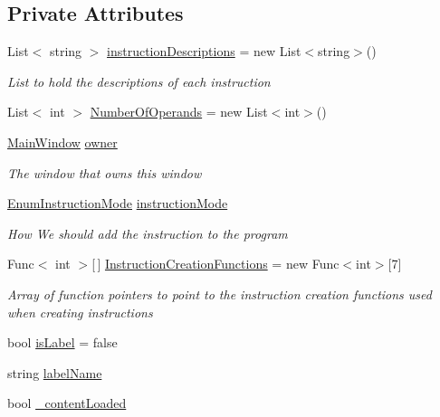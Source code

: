 \subsection*{Private Attributes}
\begin{DoxyCompactItemize}
\item 
List$<$ string $>$ \hyperlink{class_c_p_u___o_s___simulator_1_1_instructions_window_a678ab4df2b78758142472eeed8c5d7ba}{instruction\+Descriptions} = new List$<$string$>$()
\begin{DoxyCompactList}\small\item\em List to hold the descriptions of each instruction \end{DoxyCompactList}\item 
List$<$ int $>$ \hyperlink{class_c_p_u___o_s___simulator_1_1_instructions_window_a6a10065d655000cc37a281b242fb7fb5}{Number\+Of\+Operands} = new List$<$int$>$()
\item 
\hyperlink{class_c_p_u___o_s___simulator_1_1_main_window}{Main\+Window} \hyperlink{class_c_p_u___o_s___simulator_1_1_instructions_window_a954c950c677c61a3b7ed7406b6dc7164}{owner}
\begin{DoxyCompactList}\small\item\em The window that owns this window \end{DoxyCompactList}\item 
\hyperlink{namespace_c_p_u___o_s___simulator_adc17a5a5e004084f05dc8e4d3f70e31f}{Enum\+Instruction\+Mode} \hyperlink{class_c_p_u___o_s___simulator_1_1_instructions_window_aae7addf8e362e26e981b36b9940a53c0}{instruction\+Mode}
\begin{DoxyCompactList}\small\item\em How We should add the instruction to the program \end{DoxyCompactList}\item 
Func$<$ int $>$\mbox{[}$\,$\mbox{]} \hyperlink{class_c_p_u___o_s___simulator_1_1_instructions_window_ae303b32cfc2f5e7cc5ab18df94fd574b}{Instruction\+Creation\+Functions} = new Func$<$int$>$\mbox{[}7\mbox{]}
\begin{DoxyCompactList}\small\item\em Array of function pointers to point to the instruction creation functions used when creating instructions \end{DoxyCompactList}\item 
bool \hyperlink{class_c_p_u___o_s___simulator_1_1_instructions_window_a22f860baf7e7b247c3823e076c4b40fb}{is\+Label} = false
\item 
string \hyperlink{class_c_p_u___o_s___simulator_1_1_instructions_window_a0fd74a9867964da88f17ebb4c0a5ff6b}{label\+Name}
\item 
bool \hyperlink{class_c_p_u___o_s___simulator_1_1_instructions_window_a7755282dffea134038e9e58c931dc297}{\+\_\+content\+Loaded}
\end{DoxyCompactItemize}


